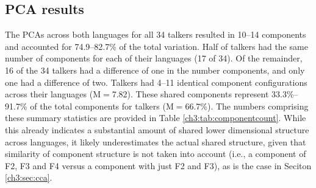 \subsection{PCA results}\label{ch3:sec:pca_results} 
The PCAs across both languages for all 34 talkers resulted in 10--14 components and accounted for 74.9--82.7\% of the total variation. Half of talkers had the same number of components for each of their languages (17 of 34). Of the remainder, 16 of the 34 talkers had a difference of one in the number components, and only one had a difference of two. Talkers had 4--11 identical component configurations across their languages (M$=$7.82). These shared components represent 33.3\%--91.7\% of the total components for talkers (M$=$66.7\%). The numbers comprising these summary statistics are provided in Table \ref{ch3:tab:componentcount}. While this already indicates a substantial amount of shared lower dimensional structure across languages, it likely underestimates the actual shared structure, given that similarity of component structure is not taken into account (i.e., a component of F2, F3 and F4 versus a component with just F2 and F3), as is the case in Seciton \ref{ch3:sec:cca}. %

